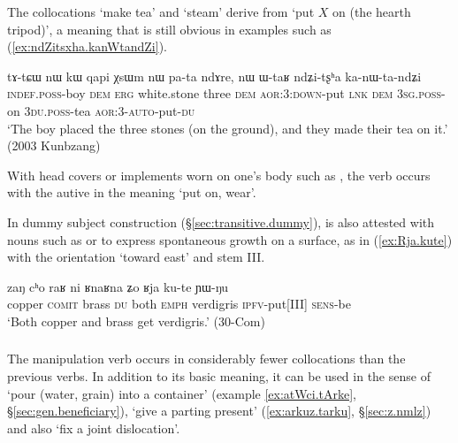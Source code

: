 The collocations  `make tea' and  `steam' derive from `put $X$ on (the hearth tripod)', a meaning that is still obvious in examples such as  (\ref{ex:ndZitsxha.kanWtandZi}).

\begin{exe}
\ex \label{ex:ndZitsxha.kanWtandZi}
\gll tɤ-tɕɯ nɯ kɯ qapi χsɯm nɯ pa-ta ndɤre, nɯ ɯ-taʁ  ndʑi-tʂʰa ka-nɯ-ta-ndʑi   \\
\textsc{indef}.\textsc{poss}-boy \textsc{dem} \textsc{erg} white.stone three \textsc{dem} \textsc{aor}:3\flobv{}:\textsc{down}-put \textsc{lnk} \textsc{dem} \textsc{3sg}.\textsc{poss}-on \textsc{3du}.\textsc{poss}-tea \textsc{aor}:3\flobv{}-\textsc{auto}-put-\textsc{du} \\
\glt `The boy placed the three stones (on the ground), and they made their tea on it.'  (2003 Kunbzang)
\end{exe}

With head covers or implements worn on one's body such as , the verb  occurs with the autive in the meaning `put on, wear'.
 
In dummy subject construction (§\ref{sec:transitive.dummy}),  is also attested with nouns such as  or  to express  spontaneous growth on a surface, as in (\ref{ex:Rja.kute}) with the orientation `toward east'  and stem III.

\begin{exe}
\ex \label{ex:Rja.kute}
\gll zaŋ cʰo raʁ ni ʁnaʁna ʑo ʁja ku-te ɲɯ-ŋu \\
copper \textsc{comit} brass \textsc{du} both \textsc{emph} verdigris \textsc{ipfv}-put[III] \textsc{sens}-be \\
\glt `Both copper and brass get verdigris.' (30-Com)
\end{exe}
 
\subsubsection{ } \label{sec:rku.lv}
The manipulation verb  occurs in considerably fewer collocations than the previous verbs. In addition to its basic meaning, it can be used in the sense of `pour (water, grain) into a container' (example \ref{ex:atWci.tArke}, §\ref{sec:gen.beneficiary}), `give a parting present' (\ref{ex:arkuz.tarku}, §\ref{sec:z.nmlz}) and also `fix a joint dislocation'.

